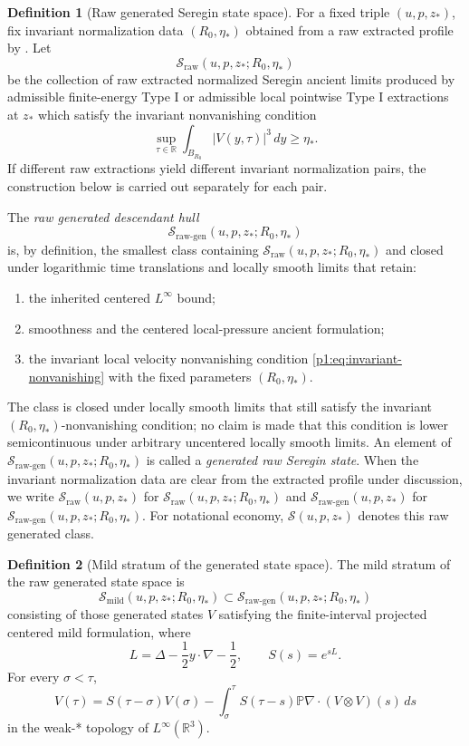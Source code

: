 \documentclass[11pt]{amsart}
\theoremstyle{plain}
\theoremstyle{definition}
\newtheorem{definition}[definition]{Definition}
\theoremstyle{remark}
\numberwithin{equation}{section}
\newcommand{\R}{\mathbb R}
\newcommand{\calS}{\mathcal S}
\begin{document}
\begin{definition}[Raw generated Seregin state space]
\label{p1:def:raw-generated-seregin-space}
\label{p1:def:seregin-collection}
For a fixed triple \((u,p,z_*)\), fix invariant normalization data
\((R_0,\eta_*)\) obtained from a raw extracted profile by
.  Let
\[
   \calS_{\mathrm{raw}}(u,p,z_*;R_0,\eta_*)
\]
be the collection of raw extracted normalized Seregin ancient limits
produced by admissible finite-energy Type I or admissible local pointwise
Type I extractions at \(z_*\) which satisfy the invariant nonvanishing
condition
\[
   \sup_{\tau\in\R}
   \int_{B_{R_0}} |V(y,\tau)|^3\,dy \ge \eta_* .
\]
If different raw extractions yield different invariant normalization pairs,
the construction below is carried out separately for each pair.

The \emph{raw generated descendant hull}
\[
   \calS_{\mathrm{raw\text{-}gen}}(u,p,z_*;R_0,\eta_*)
\]
is, by definition, the smallest class containing
\(\calS_{\mathrm{raw}}(u,p,z_*;R_0,\eta_*)\) and closed under logarithmic time
translations and locally smooth limits that retain:
\begin{enumerate}[label=(\roman*)]
\item the inherited centered \(L^\infty\) bound;
\item smoothness and the centered local-pressure ancient formulation;
\item the invariant local velocity nonvanishing condition
\eqref{p1:eq:invariant-nonvanishing} with the fixed parameters
\((R_0,\eta_*)\).
\end{enumerate}
The class is closed under locally smooth limits that still satisfy the
invariant \((R_0,\eta_*)\)-nonvanishing condition; no claim is made that
this condition is lower semicontinuous under arbitrary uncentered locally
smooth limits.  An element of
\(\calS_{\mathrm{raw\text{-}gen}}(u,p,z_*;R_0,\eta_*)\) is called
a \emph{generated raw Seregin state}.  When the invariant normalization data
are clear from the extracted profile under discussion, we write
\(\calS_{\mathrm{raw}}(u,p,z_*)\) for
\(\calS_{\mathrm{raw}}(u,p,z_*;R_0,\eta_*)\) and
\(\calS_{\mathrm{raw\text{-}gen}}(u,p,z_*)\) for
\(\calS_{\mathrm{raw\text{-}gen}}(u,p,z_*;R_0,\eta_*)\).  For notational
economy, \(\calS(u,p,z_*)\) denotes this raw generated class.
\end{definition}

\begin{definition}[Mild stratum of the generated state space]
\label{p1:def:mild-stratum}
The mild stratum of the raw generated state space is
\[
   \calS_{\mathrm{mild}}(u,p,z_*;R_0,\eta_*)
   \subset
   \calS_{\mathrm{raw\text{-}gen}}(u,p,z_*;R_0,\eta_*)
\]
consisting of those generated states \(V\) satisfying the finite-interval
projected centered mild formulation, where
\[
   L=\Delta-\frac12y\cdot\nabla-\frac12,\qquad S(s)=e^{sL}.
\]
For every \(\sigma<\tau\),
\[
   V(\tau)
   =
   S(\tau-\sigma)V(\sigma)
   -
   \int_\sigma^\tau
   S(\tau-s)\mathbb P\nabla\cdot(V\otimes V)(s)\,ds
\]
in the weak-* topology of \(L^\infty(\R^3)\).
\end{definition}
\end{document}
